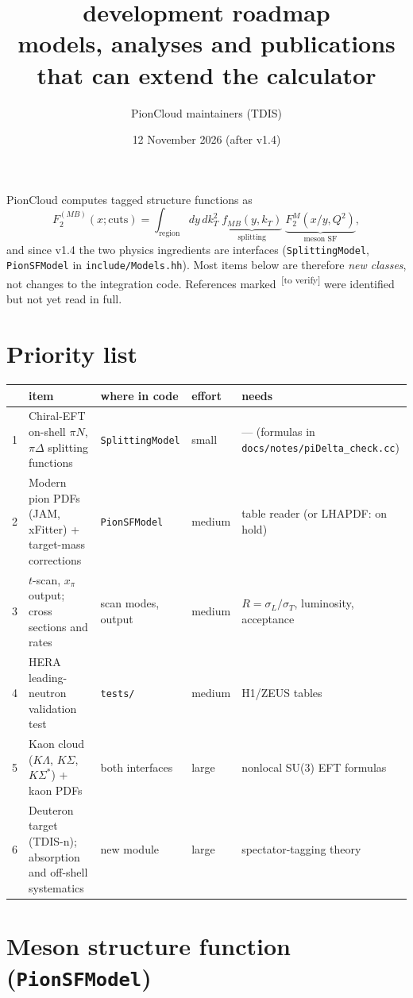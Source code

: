 \documentclass[11pt,a4paper]{article}
\title{\color{titleblue}\picloud{} development roadmap\\[2pt]
\large models, analyses and publications that can extend the calculator}
\author{PionCloud maintainers (TDIS)}
\date{12 November 2026 \quad (after v1.4)}
\newcommand{\picloud}{PionCloud}
\newcommand{\code}[1]{\texttt{#1}}
\newcommand{\verify}{\textsuperscript{\,[to verify]}}
\begin{document}
\maketitle

\noindent \picloud{} computes tagged structure functions as
\begin{equation}
F_2^{(MB)}(x;\text{cuts})=\int_{\text{region}}\! dy\,dk_T^2\;
\underbrace{f_{MB}(y,k_T)}_{\text{splitting}}\;
\underbrace{F_2^{M}(x/y,Q^2)}_{\text{meson SF}} ,
\end{equation}
and since v1.4 the two physics ingredients are interfaces
(\code{SplittingModel}, \code{PionSFModel} in \code{include/Models.hh}).
Most items below are therefore \emph{new classes}, not changes to the
integration code.  References marked \verify{} were identified but not yet
read in full.

\section*{Priority list}
\begin{center}
\small
\begin{tabular}{L{0.3cm}L{5.6cm}L{2.3cm}L{1.3cm}L{3.4cm}}
\toprule
 & item & where in code & effort & needs \\
 & Chiral-EFT on-shell $\pi N$, $\pi\Delta$ splitting functions & \code{SplittingModel} & small & --- (formulas in \code{docs/notes/piDelta\_check.cc}) \\
2 & Modern pion PDFs (JAM, xFitter) + target-mass corrections & \code{PionSFModel} & medium & table reader (or LHAPDF: on hold) \\
3 & $t$-scan, $x_\pi$ output; cross sections and rates & scan modes, output & medium & $R=\sigma_L/\sigma_T$, luminosity, acceptance \\
4 & HERA leading-neutron validation test & \code{tests/} & medium & H1/ZEUS tables \\
5 & Kaon cloud ($K\Lambda$, $K\Sigma$, $K\Sigma^*$) + kaon PDFs & both interfaces & large & nonlocal SU(3) EFT formulas \\
6 & Deuteron target (TDIS-n); absorption and off-shell systematics & new module & large & spectator-tagging theory \\
\bottomrule
\end{tabular}
\end{center}

\section{Meson structure function (\code{PionSFModel})}
\end{document}
